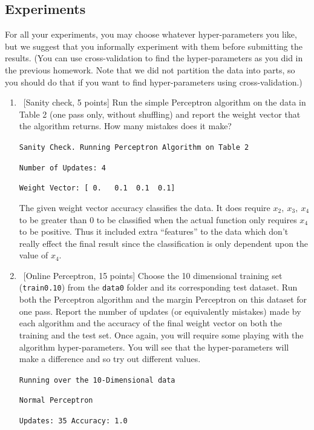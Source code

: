\subsection*{Experiments}

For all your experiments, you may choose whatever hyper-parameters you
like, but we suggest that you informally experiment with them before
submitting the results. (You can use cross-validation to find the
hyper-parameters as you did in the previous homework. Note that we did
not partition the data into parts, so you should do that if you want
to find hyper-parameters using cross-validation.)

\begin{enumerate}

\item ~[Sanity check, 5 points] Run the simple Perceptron algorithm on
  the data in Table 2 (one pass only, without shuffling) and report
  the weight vector that the algorithm returns. How many mistakes does
  it make?

  \verb~Sanity Check. Running Perceptron Algorithm on Table 2~

  \verb~Number of Updates: 4~

  \verb~Weight Vector: [ 0.   0.1  0.1  0.1]~

  The given weight vector accuracy classifies the data. It does require
  $x_2,\ x_{3},\ x_{4}$ to be greater than 0 to be classified when the actual
  function only requires $x_{4}$ to be positive. Thus it included extra
  ``features'' to the data which don't really effect the final result since
  the classification is only dependent upon the value of $x_{4}$.


\item ~[Online Perceptron, 15 points] Choose the 10 dimensional
  training set ({\tt train0.10}) from the {\tt data0} folder and its
  corresponding test dataset. Run both the Perceptron algorithm and
  the margin Perceptron on this dataset for one pass. Report the
  number of updates (or equivalently mistakes) made by each algorithm
  and the accuracy of the final weight vector on both the training and
  the test set. Once again, you will require some playing with the
  algorithm hyper-parameters. You will see that the hyper-parameters
  will make a difference and so try out different values.

  \verb~Running over the 10-Dimensional data~

  \verb~Normal Perceptron~

  \verb~Updates: 35 Accuracy: 1.0~


\end{enumerate}
